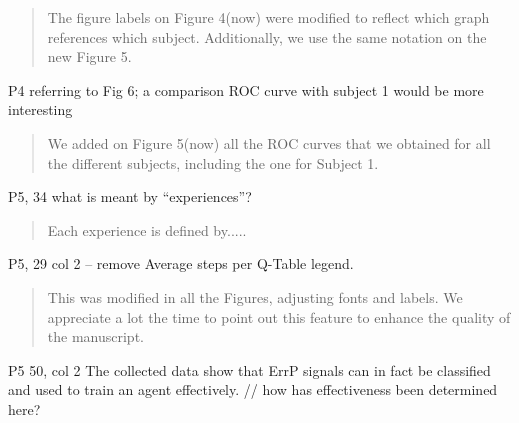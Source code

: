 \documentclass[journal,onecolumn,12pt]{IEEEtran}
\begin{document}
\begin{quotation}
{\color{blue}
The figure labels on Figure 4(now) were modified to reflect which graph references which subject.  Additionally, we use the same notation on the new Figure 5.
}
\end{quotation}

P4 referring to Fig 6; a comparison ROC curve with subject 1 would be more interesting

\begin{quotation}
{\color{blue}
We added on Figure 5(now) all the ROC curves that we obtained for all the different subjects, including the one for Subject 1.  
}
\end{quotation}


P5, 34 what is meant by “experiences”?

\begin{quotation}
{\color{blue}
Each experience is defined by.....
}
\end{quotation}

P5, 29 col 2 – remove Average steps per Q-Table legend.

\begin{quotation}
{\color{blue}
This was modified in all the Figures, adjusting fonts and labels.  We appreciate a lot the time to point out this feature to enhance the quality of the manuscript.
}
\end{quotation}

P5 50, col 2 The collected data show that ErrP signals can in fact be classified and used to train an agent effectively.
// how has effectiveness been determined here?
\end{document}
